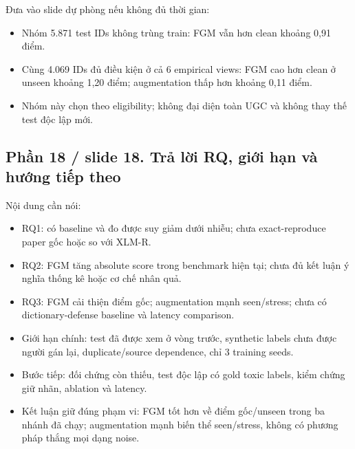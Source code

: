 \documentclass[11pt,a4paper]{article}
\begin{document}
Đưa vào slide dự phòng nếu không đủ thời gian:


\begin{itemize}

\item Nhóm 5.871 test IDs không trùng train: FGM vẫn hơn clean khoảng 0,91 điểm.

\item Cùng 4.069 IDs đủ điều kiện ở cả 6 empirical views: FGM cao hơn clean ở unseen khoảng 1,20 điểm; augmentation thấp hơn khoảng 0,11 điểm.

\item Nhóm này chọn theo eligibility; không đại diện toàn UGC và không thay thế test độc lập mới.

\end{itemize}

\subsection*{Phần 18 / slide 18. Trả lời RQ, giới hạn và hướng tiếp theo}

Nội dung cần nói:


\begin{itemize}

\item RQ1: có baseline và đo được suy giảm dưới nhiễu; chưa exact-reproduce paper gốc hoặc so với XLM-R.

\item RQ2: FGM tăng absolute score trong benchmark hiện tại; chưa đủ kết luận ý nghĩa thống kê hoặc cơ chế nhân quả.

\item RQ3: FGM cải thiện điểm gốc; augmentation mạnh seen/stress; chưa có dictionary-defense baseline và latency comparison.

\item Giới hạn chính: test đã được xem ở vòng trước, synthetic labels chưa được người gán lại, duplicate/source dependence, chỉ 3 training seeds.

\item Bước tiếp: đối chứng còn thiếu, test độc lập có gold toxic labels, kiểm chứng giữ nhãn, ablation và latency.

\item Kết luận giữ đúng phạm vi: FGM tốt hơn về điểm gốc/unseen trong ba nhánh đã chạy; augmentation mạnh biến thể seen/stress, không có phương pháp thắng mọi dạng noise.

\end{itemize}
\end{document}
